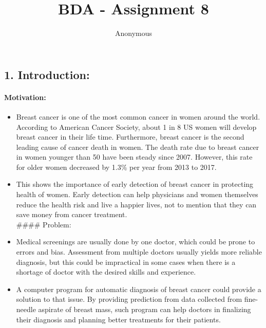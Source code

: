 \documentclass[
]{article}
\title{BDA - Assignment 8}
\author{Anonymous}
\date{}
\providecommand{\tightlist}{%
  \setlength{\itemsep}{0pt}\setlength{\parskip}{0pt}}
\begin{document}
\maketitle

{
\setcounter{tocdepth}{1}
\tableofcontents
}
\hypertarget{introduction}{%
\subsection{1. Introduction:}\label{introduction}}

\hypertarget{motivation}{%
\paragraph{Motivation:}\label{motivation}}

\begin{itemize}
\tightlist
\item
  Breast cancer is one of the most common cancer in women around the
  world. According to American Cancer Society, about 1 in 8 US women
  will develop breast cancer in their life time. Furthermore, breast
  cancer is the second leading cause of cancer death in women. The death
  rate due to breast cancer in women younger than 50 have been steady
  since 2007. However, this rate for older women decreased by 1.3\% per
  year from 2013 to 2017.
\item
  This shows the importance of early detection of breast cancer in
  protecting health of women. Early detection can help physicians and
  women themselves reduce the health risk and live a happier lives, not
  to mention that they can save money from cancer treatment.\\
  \#\#\#\# Problem:\\
\item
  Medical screenings are usually done by one doctor, which could be
  prone to errors and bias. Assessment from multiple doctors usually
  yields more reliable diagnosis, but this could be impractical in some
  cases when there is a shortage of doctor with the desired skills and
  experience.\\
\item
  A computer program for automatic diagnosis of breast cancer could
  provide a solution to that issue. By providing prediction from data
  collected from fine-needle aspirate of breast mass, such program can
  help doctors in finalizing their diagnosis and planning better
  treatments for their patients.
\end{itemize}
\end{document}
